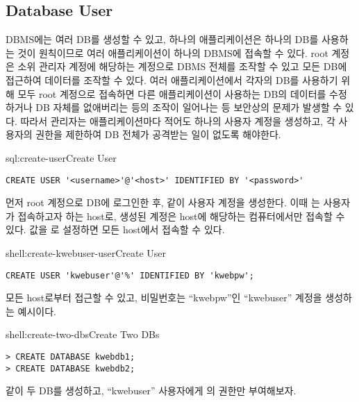 \subsection*{Database User}

DBMS에는 여러 DB를 생성할 수 있고, 하나의 애플리케이션은 하나의 DB를 사용하는 것이 원칙이므로 여러 애플리케이션이 하나의 DBMS에 접속할 수 있다. root 계정은 소위 관리자 계정에 해당하는 계정으로 DBMS 전체를 조작할 수 있고 모든 DB에 접근하여 데이터를 조작할 수 있다. 여러 애플리케이션에서 각자의 DB를 사용하기 위해 모두 root 계정으로 접속하면 다른 애플리케이션이 사용하는 DB의 데이터를 수정하거나 DB 자체를 없애버리는 등의 조작이 일어나는 등 보안상의 문제가 발생할 수 있다. 따라서 관리자는 애플리케이션마다 적어도 하나의 사용자 계정을 생성하고, 각 사용자의 권한을 제한하여 DB 전체가 공격받는 일이 없도록 해야한다.

\begin{sqlenv}{sql:create-user}{Create User}\begin{verbatim}
CREATE USER '<username>'@'<host>' IDENTIFIED BY '<password>'
\end{verbatim}
\end{sqlenv}

먼저 root 계정으로 DB에 로그인한 후, \과 같이 사용자 계정을 생성한다. 이때 는 사용자가 접속하고자 하는 host로, 생성된 계정은 host에 해당하는 컴퓨터에서만 접속할 수 있다.  값을 \cd{\%}로 설정하면 모든 host에서 접속할 수 있다.

\begin{shellenv}{shell:create-kwebuser-user}{Create  User}\begin{verbatim}
CREATE USER 'kwebuser'@'%' IDENTIFIED BY 'kwebpw';
\end{verbatim}
\end{shellenv}

\는 모든 host로부터 접근할 수 있고, 비밀번호는 ``kwebpw''인 ``kwebuser'' 계정을 생성하는 예시이다.

\begin{shellenv}{shell:create-two-dbs}{Create Two DBs}\begin{verbatim}
> CREATE DATABASE kwebdb1;
> CREATE DATABASE kwebdb2;
\end{verbatim}
\end{shellenv}

\와 같이 두 DB를 생성하고, ``kwebuser'' 사용자에게 의 권한만 부여해보자.

